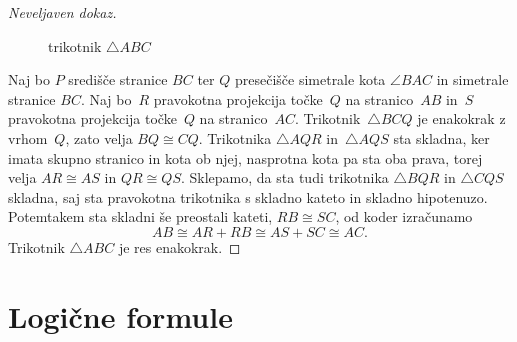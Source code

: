 \begin{proof}[Neveljaven dokaz]
\begin{figure}[ht]
\begin{center}
\end{center}
    \caption{trikotnik $\triangle ABC$}
    \label{fig:trikotnik}
  \end{figure}
  Naj bo $P$ središče stranice $BC$ ter $Q$ presečišče simetrale kota $\angle BAC$ in simetrale stranice $BC$.
  Naj bo~$R$ pravokotna projekcija točke~$Q$ na stranico~$AB$ in~$S$ pravokotna projekcija točke~$Q$ na stranico~$AC$.
  Trikotnik~$\triangle BCQ$ je enakokrak z vrhom~$Q$, zato velja $BQ \cong CQ$.
  Trikotnika $\triangle AQR$ in~$\triangle AQS$ sta skladna, ker imata skupno stranico in kota ob njej, nasprotna kota pa sta oba prava, torej velja $AR \cong AS$ in $QR \cong QS$.
  Sklepamo, da sta tudi trikotnika $\triangle BQR$ in $\triangle CQS$ skladna, saj sta pravokotna trikotnika s skladno kateto in skladno hipotenuzo. Potemtakem sta skladni še preostali kateti, $RB \cong SC$, od koder izračunamo
  \begin{equation*}
    AB \cong AR + RB \cong AS + SC \cong AC.
  \end{equation*}
  Trikotnik $\triangle ABC$ je res enakokrak.
\end{proof}



\section{Logične formule}
\label{sec:simbolni-zapis-izjav}

